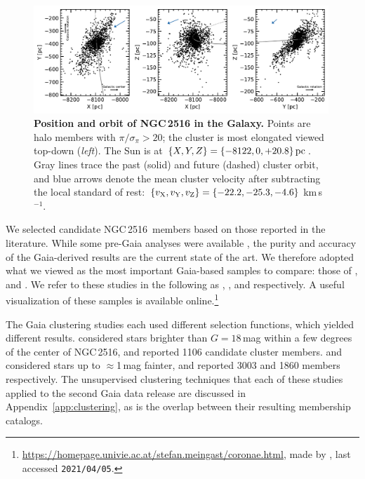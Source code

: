 \documentclass[12pt,twocolumn,tighten]{aastex63}
\newcommand{\cn}{NGC\,2516} %
\newcommand{\kms}{\,km\,s$^{-1}$}
\begin{document}
\begin{figure}[t]
	\begin{center}
		\leavevmode
		\includegraphics[width=0.99\textwidth]{f11.pdf}
	\end{center}
	\vspace{-0.7cm}
  \caption{ {\bf Position and orbit of NGC\,2516 in the Galaxy.}
  Points are halo members with $\pi/\sigma_\pi>20$; the cluster is
  most elongated viewed top-down ({\it left}). 
  The Sun is at $\{X,Y,Z\} = \{ -8122, 0, +20.8\}\,{\rm pc}$.
  Gray lines trace the past (solid) and future (dashed)
  cluster orbit, and blue arrows denote the mean cluster
  velocity after subtracting the local standard of rest: $\{v_{\rm X},
  v_{\rm Y}, v_{\rm Z}\} = \{-22.2, -25.3, -4.6\}$\kms. 
  \label{fig:XYZ}
	}
\end{figure}

We selected candidate \cn\ members based on those reported in the
literature.  While some pre-Gaia analyses were available
\citep{jeffries_ngc2516_2001,Kharchenko_et_al_2013}, the purity and
accuracy of the Gaia-derived results are the current state of the art.
We therefore adopted what we viewed as the most important Gaia-based
samples to compare: those of \citet{cantatgaudin_gaia_2018},
\citet{kounkel_untangling_2019} and \citet{meingast_2021}.  We refer
to these studies in the following as
,
, and 
respectively.  A useful visualization of these samples is
available online.\footnote{
  \url{https://homepage.univie.ac.at/stefan.meingast/coronae.html},
  made by \citet{meingast_2021}, last accessed \texttt{2021/04/05}.}

The Gaia clustering studies each used different selection functions,
which yielded different results.  
considered stars brighter than $G=18$\,mag within a few degrees of the
center of \cn, and reported 1106 candidate cluster members.
 and 
considered stars up to $\approx$1\,mag fainter, and reported 3003 and
1860 members respectively.  The unsupervised clustering techniques
that each of these studies applied to the second Gaia data release are
discussed in Appendix~\ref{app:clustering}, as is the overlap between
their resulting membership catalogs.
\end{document}
